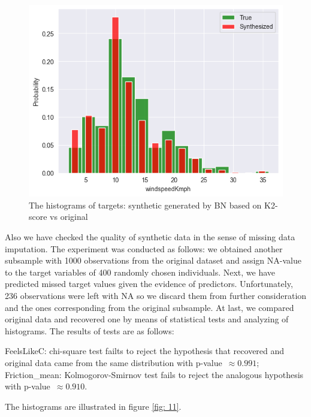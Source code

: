 \documentclass[12pt, bachelor, substylefile = algo_title.rtx]{disser}
\theoremstyle{definition}
\begin{document}
\begin{figure}[!h]
\begin{minipage}{.48\textwidth}
     \includegraphics[width=\linewidth]{bn23}
   \end{minipage}
\caption{The histograms of targets: synthetic generated by BN based on K2-score vs original}
\label{fig: 10}
\end{figure}

Also we have checked the quality of synthetic data in the sense of missing data imputation. The experiment was conducted as follows: we obtained another subsample with 1000 observations from the original dataset and assign NA-value to the target variables of 400 randomly chosen individuals. Next, we have predicted missed target values given the evidence of predictors. Unfortunately, 236 observations were left with NA so we discard them from further consideration and the ones corresponding from the original subsample. At last, we compared original data and recovered one by means of statistical tests and analyzing of histograms. The results of tests are as follows:
\begin{outline}
\1 FeelsLikeC: chi-square test failts to reject the hypothesis that recovered and original data came from the same distribution with p-value~$ \approx 0.991$;
\1 Friction\_mean: Kolmogorov-Smirnov test fails to reject the analogous hypothesis with p-value~$ \approx 0.910$.
\end{outline}

The histograms are illustrated in figure \ref{fig: 11}.
\end{document}
